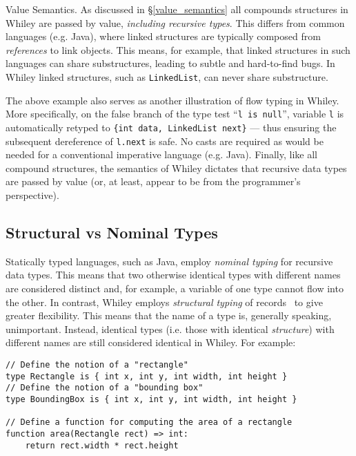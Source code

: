 \begin{insight}{Value Semantics.}
  As discussed in \S\ref{value_semantics} all compounds structures in
  Whiley are passed by value, {\em including recursive types}.  This
  differs from common languages (e.g. Java), where linked structures
  are typically composed from {\em references} to link objects.  This
  means, for example, that linked structures in such languages can
  share substructures, leading to subtle and hard-to-find bugs.  In
  Whiley linked structures, such as \lstinline{LinkedList}, can never
  share substructure.
\end{insight}

The above example also serves as another illustration of flow typing
in Whiley.  More specifically, on the false branch of the type test
``\lstinline{l is null}'', variable \lstinline{l} is automatically
retyped to \lstinline+{int data, LinkedList next}+ --- thus ensuring
the subsequent dereference of \lstinline{l.next} is safe.  No casts
are required as would be needed for a conventional imperative language
(e.g. Java).  Finally, like all compound structures, the semantics of
Whiley dictates that recursive data types are passed by value (or, at
least, appear to be from the programmer's perspective).

\subsection{Structural vs Nominal Types}
Statically typed languages, such as Java, employ {\em nominal typing}
for recursive data types.  This means that two otherwise identical
types with different names are considered distinct and, for example, a
variable of one type cannot flow into the other.  In contrast, Whiley employs {\em structural typing} of records~\cite{Card88} to give greater flexibility.  This means that the name of a type is, generally speaking, unimportant.  Instead, identical types (i.e. those with identical {\em structure}) with different names are still considered identical in Whiley.  For example:

\begin{lstlisting}
// Define the notion of a "rectangle"
type Rectangle is { int x, int y, int width, int height }
// Define the notion of a "bounding box"
type BoundingBox is { int x, int y, int width, int height }

// Define a function for computing the area of a rectangle
function area(Rectangle rect) => int:
    return rect.width * rect.height
\end{lstlisting}

